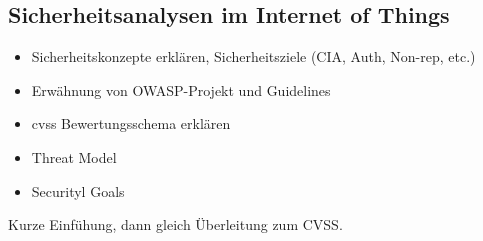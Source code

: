 \subsection{Sicherheitsanalysen im Internet of Things}
\label{sec:sota_sa}
	
	\begin{itemize}
		\item Sicherheitskonzepte erklären, Sicherheitsziele (CIA, Auth, Non-rep, etc.)
		\item Erwähnung von OWASP-Projekt und Guidelines
		\item \gls{cvss} Bewertungsschema erklären
		\item Threat Model
		\item Securityl Goals
	\end{itemize}
	Kurze Einfühung, dann gleich Überleitung zum CVSS.
	
